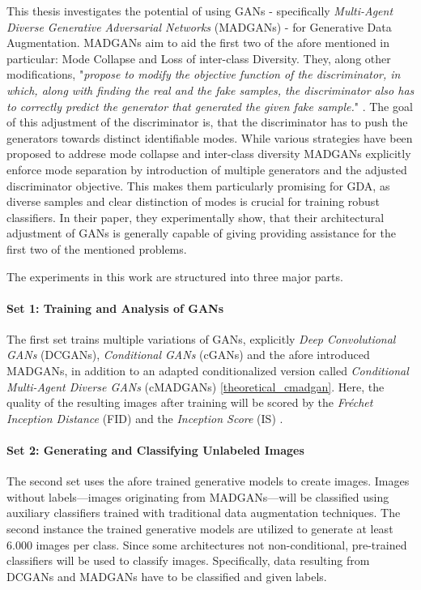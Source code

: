 This thesis investigates the potential of using GANs - specifically \textit{Multi-Agent Diverse Generative Adversarial Networks} (MADGANs) \cite{ghosh2018madgan} - for Generative Data Augmentation. MADGANs aim to aid the first two of the afore mentioned in particular: Mode Collapse and Loss of inter-class Diversity. They, along other modifications, "\textit{propose to modify the objective function of the discriminator, in which, along with finding the real and the fake samples, the discriminator also has to correctly predict the generator that generated the given fake sample.}" \cite{ghosh2018madgan}. The goal of this adjustment of the discriminator is, that the discriminator has to push the generators towards distinct identifiable modes. While various strategies have been proposed to addrese mode collapse and inter-class diversity MADGANs explicitly enforce mode separation by introduction of multiple generators and the adjusted discriminator objective. This makes them particularly promising for GDA, as diverse samples and clear distinction of modes is crucial for training robust classifiers. In their paper, they experimentally show, that their architectural adjustment of GANs is generally capable of giving providing assistance for the first two of the mentioned problems.

The experiments in this work are structured into three major parts.

\paragraph{Set 1: Training and Analysis of GANs}  \label{thesis_goal_1}
The first set trains multiple variations of GANs, explicitly \textit{Deep Convolutional GANs} (DCGANs), \textit{Conditional GANs} (cGANs) and the afore introduced MADGANs, in addition to an adapted conditionalized version called \textit{Conditional Multi-Agent Diverse GANs} (cMADGANs) \ref{theoretical_cmadgan}. Here, the quality of the resulting images after training will be scored by the \textit{Fréchet Inception Distance} (FID) \cite{heusel2018ganstrainedtimescaleupdate} and the \textit{Inception Score} (IS) \cite{salimans2016improvedtechniquestraininggans}.

\paragraph{Set 2: Generating and Classifying Unlabeled Images}  \label{thesis_goal_2}
The second set uses the afore trained generative models to create images. Images without labels—images originating from MADGANs—will be classified using auxiliary classifiers trained with traditional data augmentation techniques.
The second instance the trained generative models are utilized to generate at least $6.000$ images per class. Since some architectures not non-conditional, pre-trained classifiers will be used to classify images. Specifically, data resulting from DCGANs and MADGANs have to be classified and given labels. 

